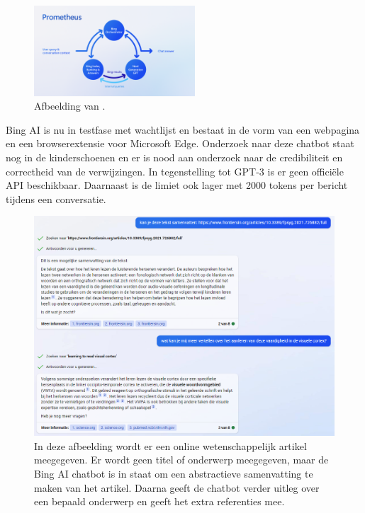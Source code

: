 \begin{figure}[H]
	\includegraphics[width=6cm]{img/bing-ai-prometheus.png}
	\caption{Afbeelding van \textcite{Ribas2023}.}
\end{figure}

Bing AI is nu in testfase met wachtlijst en bestaat in de vorm van een webpagina en een browserextensie voor Microsoft Edge. Onderzoek naar deze chatbot staat nog in de kinderschoenen en er is nood aan onderzoek naar de credibiliteit en correctheid van de verwijzingen. In tegenstelling tot GPT-3 is er geen officiële API beschikbaar. Daarnaast is de limiet ook lager met 2000 tokens per bericht tijdens een conversatie.

\begin{figure}[H]
	\includegraphics{img/bing-ai-chatbot-example.png}
	\caption{In deze afbeelding wordt er een online wetenschappelijk artikel meegegeven. Er wordt geen titel of onderwerp meegegeven, maar de Bing AI chatbot is in staat om een abstractieve samenvatting te maken van het artikel. Daarna geeft de chatbot verder uitleg over een bepaald onderwerp en geeft het extra referenties mee.}
\end{figure}






